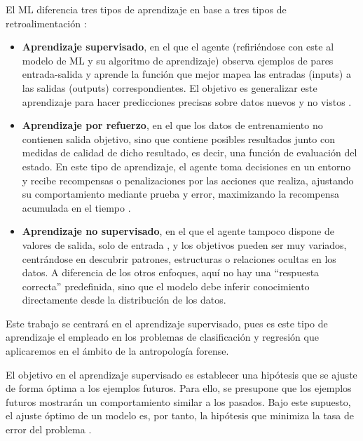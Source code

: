 El ML diferencia tres tipos de aprendizaje en base a tres tipos de retroalimentación \cite{rusell2021}: 

\begin{itemize}
    
    \item \textbf{Aprendizaje supervisado}, en el que el agente (refiriéndose con este al modelo de ML y su 
    algoritmo de aprendizaje) observa ejemplos de pares entrada-salida y aprende la función que mejor mapea 
    las entradas (inputs) a las salidas (outputs) correspondientes. El objetivo es generalizar este 
    aprendizaje para hacer predicciones precisas sobre datos nuevos y no vistos \cite{bishop2006}.

    \item \textbf{Aprendizaje por refuerzo}, en el que los datos de entrenamiento no contienen salida 
    objetivo, sino que contiene posibles resultados junto con medidas de calidad de dicho resultado, es decir, 
    una función de evaluación del estado. En este tipo de aprendizaje, el agente toma decisiones en un entorno 
    y recibe recompensas o penalizaciones por las acciones que realiza, ajustando su comportamiento mediante 
    prueba y error, maximizando la recompensa acumulada en el tiempo \cite{alpaydin2010}.

    \item \textbf{Aprendizaje no supervisado}, en el que el agente tampoco dispone de valores de salida, solo 
    de entrada \cite{bishop2006}, y los objetivos pueden ser muy variados, centrándose en descubrir patrones, 
    estructuras o relaciones ocultas en los datos. A diferencia de los otros enfoques, aquí no hay una 
    ``respuesta correcta'' predefinida, sino que el modelo debe inferir conocimiento directamente desde la 
    distribución de los datos.

\end{itemize}

Este trabajo se centrará en el aprendizaje supervisado, pues es este tipo de aprendizaje el empleado en los 
problemas de clasificación y regresión que aplicaremos en el ámbito de la antropología forense.

El objetivo en el aprendizaje supervisado es establecer una hipótesis que se ajuste de forma óptima a los
ejemplos futuros. Para ello, se presupone que los ejemplos futuros mostrarán un comportamiento similar a los
pasados. Bajo este supuesto, el ajuste óptimo de un modelo es, por tanto, la hipótesis que minimiza la tasa
de error del problema \cite{rusell2021}.


